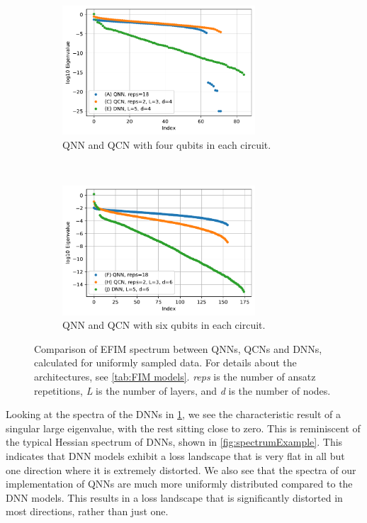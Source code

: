 \begin{figure}[H]
    \centering
    \begin{subfigure}[t]{0.5\textwidth}
        \centering
        \includegraphics[height=1.9in]{latex/figures/FIM_qubits_4.pdf}
        \caption{QNN and QCN with four qubits in each circuit.}
    \end{subfigure}%
    ~ 
    \begin{subfigure}[t]{0.5\textwidth}
        \centering
        \includegraphics[height=1.9in]{latex/figures/FIM_qubits_6.pdf}
        \caption{QNN and QCN with six qubits in each circuit.}
    \end{subfigure}
    \caption{Comparison of EFIM spectrum between QNNs, QCNs and DNNs, calculated for uniformly sampled data. For details about the architectures, see \cref{tab:FIM models}. \emph{reps} is the number of ansatz repetitions, \emph{L} is the number of layers, and \emph{d} is the number of nodes.}
    \label{fig:FIM Comparison}
\end{figure}

Looking at the spectra of the DNNs in \cref{fig:FIM Comparison}, we see the characteristic result of a singular large eigenvalue, with the rest sitting close to zero. This is reminiscent of the typical Hessian spectrum of DNNs, shown in \cref{fig:spectrumExample}.  This indicates that DNN models exhibit a loss landscape that is very flat in all but one direction where it is extremely distorted. We also see that the spectra of our implementation of QNNs are much more uniformly distributed compared to the DNN models. This results in a loss landscape that is significantly distorted in most directions, rather than just one. 


